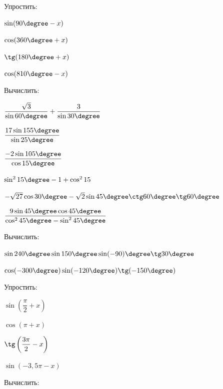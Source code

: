 %
%
%
%
\begin{class}[number=1]
	\begin{listofex}
		\item Упростить:
		\begin{enumcols}[itemcolumns=4]
			\item \( \sin(90\degree-x) \)
			\item \( \cos(360\degree + x) \)
			\item \( \tg(180\degree+x) \)
			\item \( \cos(810\degree-x) \)
		\end{enumcols}
		\item Вычислить:
		\begin{enumcols}[itemcolumns=2]
			\item \( \dfrac{\sqrt{3}}{\sin60\degree}+\dfrac{3}{\sin30\degree} \)
			\item \( \dfrac{17\sin155\degree}{\sin25\degree} \)
			\item \( \dfrac{-2\sin105\degree}{\cos15\degree} \)
			\item \( \sin^215\degree-1+\cos^215 \)
			\item \( -\sqrt{27}\cos30\degree-\sqrt{2}\sin45\degree\ctg60\degree\tg60\degree\)
			\item \( \dfrac{9\sin45\degree\cos45\degree}{\cos^245\degree-\sin^245\degree} \)
		\end{enumcols}
		\item Вычислить:
		\begin{enumcols}[itemcolumns=2]
			\item \( \sin240\degree\sin150\degree\sin(-90)\degree\tg30\degree \)
			\item \( \cos(-300\degree)\sin(-120\degree)\tg(-150\degree) \)
		\end{enumcols}
		\item Упростить:
		\begin{enumcols}[itemcolumns=4]
			\item \( \sin\left( \dfrac{\pi}{2}+x \right) \)
			\item \( \cos(\pi+x) \)
			\item \( \tg\left( \dfrac{3\pi}{2}-x \right) \)
			\item \( \sin(-3,5\pi-x) \)
		\end{enumcols}
		\item Вычислить:
		\begin{enumcols}[itemcolumns=2]

\end{enumcols}
\end{listofex}
\end{class}
